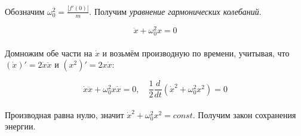 \documentclass[dvipdfmx]{article}
\begin{document}
\paragraph{}
Обозначим $\omega_0^2 = \frac{|f'(0)|}{m}$. Получим \emph{уравнение гармонических колебаний}.

\begin{equation*}
  \ddot{x} + \omega_0^2x = 0
\end{equation*}

\paragraph{}
Домножим обе части на $\dot{x}$ и возьмём производную по времени, учитывая, что $(\dot{x})' = 2\dot{x}\ddot{x}$ и
$(x^2)' = 2x\dot{x}$:

\begin{equation*}
  \dot{x}\ddot{x} + \omega_0^2x\dot{x} = 0, \quad \frac{1}{2}\frac{d}{dt}(\dot{x}^2 + \omega_0^2x^2) = 0
\end{equation*}

\paragraph{}
Производная равна нулю, значит $\dot{x}^2 + \omega_0^2x^2 = const$. Получим закон сохранения энергии.
\end{document}
